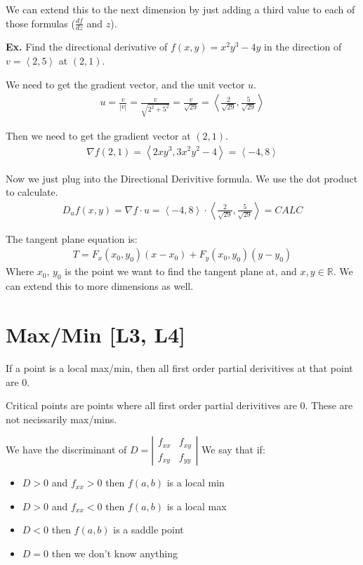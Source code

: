 \documentclass[12pt,letterpaper]{article} \usepackage{amsmath} \usepackage{graphicx} \usepackage[margin=1in]{geometry} \usepackage{longtable}  \usepackage{amssymb}
\begin{document}
	We can extend this to the next dimension by just adding a third value to each of those formulas ($\frac{df}{dz}$ and $z$).
	
	\begin{mdframed}[]
		\textbf{Ex. } Find the directional derivative of $f(x,y) = x^2y^3 - 4y$ in the direction of $v=\left<2,5\right>$ at $(2,1)$.
		
		We need to get the gradient vector, and the unit vector $u$. 
		\begin{align*}
			u = \frac{v}{|v|}=\frac{v}{\sqrt{2^2+5^2}}=\frac{v}{\sqrt{29}}=\left<\frac{2}{\sqrt{29}},\frac{5}{\sqrt{29}}\right>
		\end{align*}
	
		Then we need to get the gradient vector at $(2,1)$.
		\begin{align*}
			\nabla f(2,1)=\left<2xy^3,3x^2y^2-4\right> = \left<-4,8\right>
		\end{align*}
	
		Now we just plug into the Directional Derivitive formula. We use the dot product to calculate.
		\begin{align*}
			D_u f(x,y) = \nabla f \cdot u = \left<-4,8\right> \cdot \left<\frac{2}{\sqrt{29}},\frac{5}{\sqrt{29}}\right> = CALC
		\end{align*}
	\end{mdframed}

	The tangent plane equation is:
	\begin{align*}
		T= F_x (x_0, y_0) (x-x_0) + F_y (x_0, y_0) (y-y_0)
	\end{align*}
	Where $x_0$, $y_0$ is the point we want to find the tangent plane at, and $x, y \in \mathbb{R}$. We can extend this to more dimensions as well.
	
	\section{Max/Min [L3, L4]}
	If a point is a local max/min, then all first order partial derivitives at that point are 0. 
	
	Critical points are points where all first order partial derivitives are 0. These are not necissarily max/mins.
	
	We have the discriminant of $D = \left| 
	\begin{array}{cc}
		f_{xx} & f_{xy} \\
		f_{xy} & f_{yy}
	\end{array} \right|$
	We say that if:
	\begin{itemize}[]
		\item $D>0$ and $f_{xx} > 0$ then $f(a,b)$ is a local min
		\item $D>0$ and $f_{xx} < 0$ then $f(a,b)$ is a local max
		\item $D<0$ then $f(a,b)$ is a saddle point
		\item $D=0$ then we don't know anything
	\end{itemize}
\end{document}
